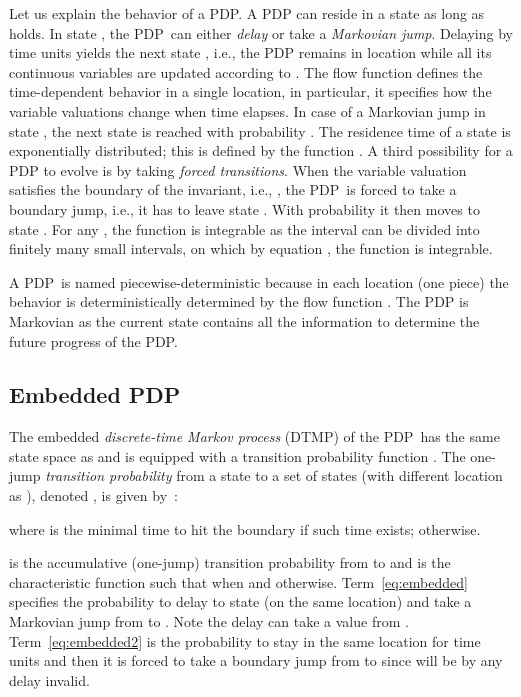 \documentclass{LMCS}
\newcommand{\<}{\langle}
\renewcommand{\>}{\rangle}
\newcommand{\DTMP}{\textsc{DTMP}}
\newcommand{\PDP}{\textsc{PDP}}
\begin{document}
\noindent Let us explain the behavior of a PDP.
A PDP can reside in a state  as long as
 holds.
In state , the \PDP\ can either \emph{delay} or take a
\emph{Markovian jump}.
Delaying by  time units yields the next state , i.e., the
PDP remains in location  while all its continuous variables are updated
according to .
The flow function  defines the time-dependent behavior in a single
location, in particular, it specifies how the variable valuations change when
time elapses.
In case of a Markovian jump in state , the next state  is reached with probability .
The residence time of a state is exponentially distributed; this is defined
by the function .
A third possibility for a PDP to evolve is by taking \emph{forced transitions}.
When the variable valuation  satisfies the boundary of the invariant, i.e.,
, the \PDP\ is forced to take a boundary jump,
i.e., it has to leave state .
With probability  it then moves to state .
For any , the function  is integrable as the
interval  can be divided into finitely many small intervals, on which
by equation , the function  is integrable.

A \PDP\ is named piecewise-deterministic because in each location (one piece)
the behavior is deterministically determined by the flow function .
The PDP is Markovian as the current state contains all the information to
determine the future progress of the PDP.

\subsection{Embedded PDP}
The embedded  \emph{discrete-time Markov process} (\DTMP) 
of the \PDP\  has the same state space  as  and is
equipped with a transition probability function .
The one-jump \emph{transition probability} from a state  to a set  of states (with different location as ), denoted
, is given by~\cite{Dav93}:

where  is the
minimal time to hit the boundary if such time exists;  otherwise.

is the accumulative (one-jump) transition probabi\-li\-ty from  to  and
 is the characteristic function such that  when  and  otherwise.
Term~\eqref{eq:embedded} specifies the probability to delay to state 
(on the same location) and take a Markovian jump from  to .
Note the delay  can take a value from .
Term~\eqref{eq:embedded2} is the probability to stay in the same location for
 time units and then it is forced to take a boundary jump from  to  since  will be by any delay invalid.
\end{document}
